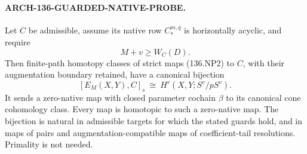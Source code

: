 \paragraph{ARCH-136-GUARDED-NATIVE-PROBE.}
Let \(C\) be admissible, assume its native row
\(C_*^{m,q}\) is horizontally acyclic, and require
\[
                         M+v\geq W_C(D).                \tag{136.NP5}
\]
Then finite-path homotopy classes of strict maps (136.NP2) to
\(C\), with their augmentation boundary retained, have a
canonical bijection
\[
 [E_M(X,Y),C]_s\ \cong\ H^r(X,Y;S^v/pS^v).
                                                               \tag{136.NP6}
\]
It sends a zero-native map with closed parameter cochain \(\beta\)
to its canonical cone cohomology class.  Every map is homotopic
to such a zero-native map.  The bijection is natural in admissible
targets for which the stated guards hold, and in maps of pairs
and augmentation-compatible maps of coefficient-tail resolutions.
Primality is not needed.

